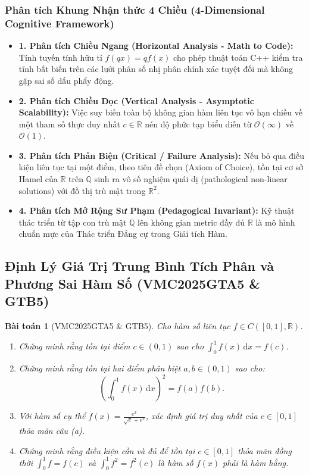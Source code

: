 \documentclass{article}
\newtheorem{baitoan}{Bài toán}
\begin{document}
\subsubsection*{Phân tích Khung Nhận thức 4 Chiều (4-Dimensional Cognitive Framework)}
\begin{itemize}
    \item \textbf{1. Phân tích Chiều Ngang (Horizontal Analysis - Math to Code):} Tính tuyến tính hữu tỉ $f(qx) = qf(x)$ cho phép thuật toán C++ kiểm tra tính bất biến trên các lưới phân số nhị phân chính xác tuyệt đối mà không gặp sai số dấu phẩy động.
    \item \textbf{2. Phân tích Chiều Dọc (Vertical Analysis - Asymptotic Scalability):} Việc suy biến toàn bộ không gian hàm liên tục vô hạn chiều về một tham số thực duy nhất $c \in \mathbb{R}$ nén độ phức tạp biểu diễn từ $\mathcal{O}(\infty)$ về $\mathcal{O}(1)$.
    \item \textbf{3. Phân tích Phản Biện (Critical / Failure Analysis):} Nếu bỏ qua điều kiện liên tục tại một điểm, theo tiên đề chọn (Axiom of Choice), tồn tại cơ sở Hamel của $\mathbb{R}$ trên $\mathbb{Q}$ sinh ra vô số nghiệm quái dị (pathological non-linear solutions) với đồ thị trù mật trong $\mathbb{R}^2$.
    \item \textbf{4. Phân tích Mở Rộng Sư Phạm (Pedagogical Invariant):} Kỹ thuật thác triển từ tập con trù mật $\mathbb{Q}$ lên không gian metric đầy đủ $\mathbb{R}$ là mô hình chuẩn mực của Thác triển Đẳng cự trong Giải tích Hàm.
\end{itemize}

\subsection{Định Lý Giá Trị Trung Bình Tích Phân và Phương Sai Hàm Số (VMC2025GTA5 \& GTB5)}

\begin{baitoan}[VMC2025GTA5 \& GTB5]
Cho hàm số liên tục $f \in C([0, 1], \mathbb{R})$.
\begin{enumerate}
    \item[(a)] Chứng minh rằng tồn tại điểm $c \in (0, 1)$ sao cho $\int_0^1 f(x) \, \mathrm{d}x = f(c)$.
    \item[(b)] Chứng minh rằng tồn tại hai điểm phân biệt $a, b \in (0, 1)$ sao cho:
    \begin{equation}
        \left(\int_0^1 f(x) \, \mathrm{d}x\right)^2 = f(a) f(b).
    \end{equation}
    \item[(c)] Với hàm số cụ thể $f(x) = \frac{e^x}{\sqrt{e} + e^x}$, xác định giá trị duy nhất của $c \in [0, 1]$ thỏa mãn câu (a).
    \item[(d)] Chứng minh rằng điều kiện cần và đủ để tồn tại $c \in [0, 1]$ thỏa mãn đồng thời $\int_0^1 f = f(c)$ và $\int_0^1 f^2 = f^2(c)$ là hàm số $f(x)$ phải là hàm hằng.
\end{enumerate}
\end{baitoan}
\end{document}
